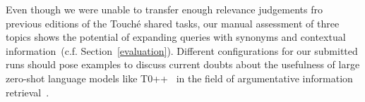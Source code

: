 
Even though we were unable to transfer enough relevance judgements fro previous editions of the Touché shared tasks, our manual assessment of three topics shows the potential of expanding queries with synonyms and contextual information~(c.f. Section~\ref{evaluation}).
Different configurations for our submitted runs should pose examples to discuss current doubts about the usefulness of large zero-shot language models like T0++~\cite{SanhWRBSACSLRDBXTSSKCNDCJWMSYPBWNRSSFFTBGBWR2021} in the field of argumentative information retrieval~\cite{ShahB2022}.
